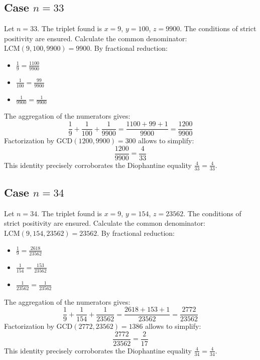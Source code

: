 \documentclass[11pt,a4paper]{article}
\begin{document}
\subsection{Case $n = 33$}
Let $n = 33$. The triplet found is $x = 9$, $y = 100$, $z = 9900$.
The conditions of strict positivity are ensured.
Calculate the common denominator: $\text{LCM}(9, 100, 9900) = 9900$.
By fractional reduction:
\begin{itemize}
    \item $\frac{1}{9} = \frac{1100}{9900}$
    \item $\frac{1}{100} = \frac{99}{9900}$
    \item $\frac{1}{9900} = \frac{1}{9900}$
\end{itemize}
The aggregation of the numerators gives:
$$ \frac{1}{9} + \frac{1}{100} + \frac{1}{9900} = \frac{1100 + 99 + 1}{9900} = \frac{1200}{9900} $$
Factorization by $\text{GCD}(1200, 9900) = 300$ allows to simplify:
$$ \frac{1200}{9900} = \frac{4}{33} $$
This identity precisely corroborates the Diophantine equality $\frac{4}{33} = \frac{4}{33}$.

\subsection{Case $n = 34$}
Let $n = 34$. The triplet found is $x = 9$, $y = 154$, $z = 23562$.
The conditions of strict positivity are ensured.
Calculate the common denominator: $\text{LCM}(9, 154, 23562) = 23562$.
By fractional reduction:
\begin{itemize}
    \item $\frac{1}{9} = \frac{2618}{23562}$
    \item $\frac{1}{154} = \frac{153}{23562}$
    \item $\frac{1}{23562} = \frac{1}{23562}$
\end{itemize}
The aggregation of the numerators gives:
$$ \frac{1}{9} + \frac{1}{154} + \frac{1}{23562} = \frac{2618 + 153 + 1}{23562} = \frac{2772}{23562} $$
Factorization by $\text{GCD}(2772, 23562) = 1386$ allows to simplify:
$$ \frac{2772}{23562} = \frac{2}{17} $$
This identity precisely corroborates the Diophantine equality $\frac{4}{34} = \frac{4}{34}$.
\end{document}
